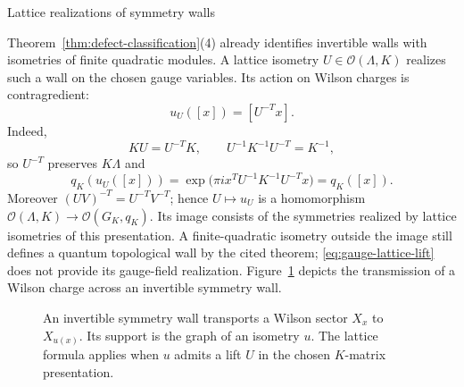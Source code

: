 \documentclass[12pt]{amsart}
\makeatletter
\renewcommand\subsection{\@startsection{subsection}{2}%
  \z@{.5\linespacing\@plus.7\linespacing}{-.5em}%
  {\normalfont\bfseries}}
\numberwithin{equation}{section}
\theoremstyle{definition}
\makeatother
\begin{document}
\subsection{Lattice realizations of symmetry walls}

Theorem~\ref{thm:defect-classification}(4) already identifies invertible
walls with isometries of finite quadratic modules. A lattice isometry
$U\in\mathcal O(\Lambda,K)$ realizes such a wall on the chosen gauge
variables. Its action on Wilson charges is contragredient:
\begin{equation}
\label{eq:gauge-lattice-lift}
u_U([x])=[U^{-T}x].
\end{equation}
Indeed,
$$
KU=U^{-T}K,\qquad
U^{-1}K^{-1}U^{-T}=K^{-1},
$$
so $U^{-T}$ preserves $K\Lambda$ and
$$
q_K(u_U([x]))
=\exp\!\bigl(\pi i x^T U^{-1}K^{-1}U^{-T}x\bigr)=q_K([x]).
$$
Moreover $(UV)^{-T}=U^{-T}V^{-T}$; hence
$U\mapsto u_U$ is a homomorphism
$\mathcal O(\Lambda,K)\to\mathcal O(G_K,q_K)$.
Its image consists of the symmetries realized by lattice isometries
of this presentation. A finite-quadratic isometry outside the image
still defines a quantum topological wall by the cited theorem;
\eqref{eq:gauge-lattice-lift} does not provide its gauge-field realization. 	Figure~\ref{fig:symmetry-wall} depicts the transmission of a Wilson charge across an invertible symmetry wall.

\begin{figure}[htbp]
\centering
{}
\caption{An invertible symmetry wall transports a Wilson sector
$X_x$ to $X_{u(x)}$. Its support is the graph of an isometry $u$.
The lattice formula applies when $u$ admits a lift $U$ in the chosen
$K$-matrix presentation.}
\label{fig:symmetry-wall}
\end{figure}
\end{document}
